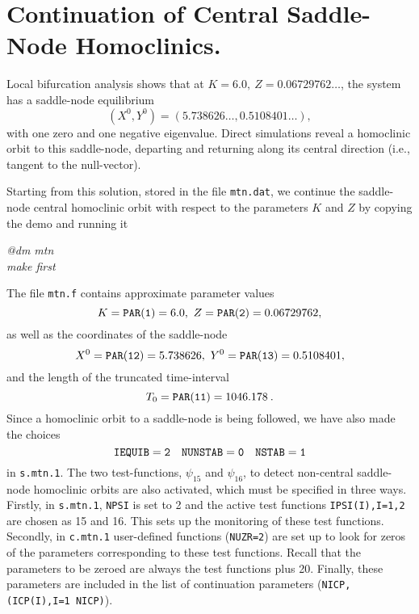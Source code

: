 \documentclass[12pt]{report}
\begin{document}
\section{Continuation of Central Saddle-Node Homoclinics.}
Local bifurcation analysis shows that at $K=6.0,\ Z=0.06729762\ldots$,
the system has a saddle-node equilibrium 
$$
(X^0,Y^0) = (5.738626\ldots,0.5108401\ldots),
$$
with one zero and one negative eigenvalue. Direct simulations reveal a
homoclinic 
orbit to this saddle-node, departing and returning along its central
direction (i.e., tangent to the null-vector).
\par
Starting from this solution, stored in the file {\tt mtn.dat}, we
continue the saddle-node central homoclinic orbit 
with respect to the parameters $K$ and $Z$ by copying the
demo and running it
\begin{center}
{\it @dm mtn}\\
{\it make first}
\end{center}
The file {\tt mtn.f} contains approximate
parameter values
$$
K={\tt PAR(1)}=6.0,\ Z={\tt PAR(2)}=0.06729762,
$$
as well as the coordinates of the saddle-node
$$
X^0={\tt PAR(12)}=5.738626,\ Y^0={\tt PAR(13)}=0.5108401,
$$
and the length of the truncated time-interval
$$
T_0={\tt PAR(11)} = 1046.178 \: .
$$
Since a homoclinic orbit to a saddle-node is being followed, we have also
made the choices
$$
{\tt IEQUIB = 2 \quad NUNSTAB =0 \quad NSTAB = 1   }
$$
in {\tt s.mtn.1}. The two test-functions, $\psi_{15}$ and $\psi_{16}$, 
to detect non-central saddle-node homoclinic
orbits are also activated, which must be specified in three ways. 
Firstly, in {\tt s.mtn.1}, {\tt NPSI} is
set to 2 and the active test functions {\tt IPSI(I),I=1,2}
are chosen as 15 and 16. This sets up the monitoring of these
test functions. Secondly, in {\tt c.mtn.1} user-defined functions
({\tt NUZR=2}) are set up to look for zeros of the parameters
corresponding to these test functions. Recall that the
parameters to be zeroed are always the test functions plus 20.
Finally, these parameters are included in the list of continuation
parameters ({\tt NICP,(ICP(I),I=1 NICP)}).
\end{document}

